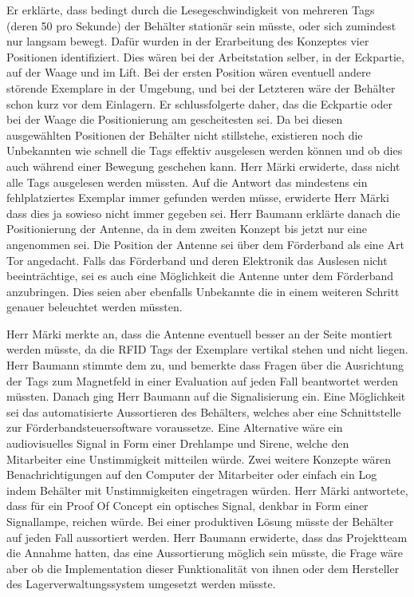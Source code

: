 \documentclass[parskip=full, a4paper]{scrreprt}
\begin{document}
Er erklärte, dass bedingt durch die Lesegeschwindigkeit von mehreren Tags (deren 50 pro Sekunde) der Behälter stationär sein müsste, oder sich zumindest nur langsam bewegt. Dafür wurden in der Erarbeitung des Konzeptes vier Positionen identifiziert. Dies wären bei der Arbeitstation selber, in der Eckpartie, auf der Waage und im Lift. Bei der ersten Position wären eventuell andere störende Exemplare in der Umgebung, und bei der Letzteren wäre der Behälter schon kurz vor dem Einlagern. Er schlussfolgerte daher, das die Eckpartie oder bei der Waage die Positionierung am gescheitesten sei. Da bei diesen ausgewählten Positionen der Behälter nicht stillstehe, existieren noch die Unbekannten wie schnell die Tags effektiv ausgelesen werden können und ob dies auch während einer Bewegung geschehen kann. Herr Märki erwiderte, dass nicht alle Tags ausgelesen werden müssten. Auf die Antwort das mindestens ein fehlplatziertes Exemplar immer gefunden werden müsse, erwiderte Herr Märki dass dies ja sowieso nicht immer gegeben sei.
Herr Baumann erklärte danach die Positionierung der Antenne, da in dem zweiten Konzept bis jetzt nur eine angenommen sei. Die Position der Antenne sei über dem Förderband als eine Art Tor angedacht. Falls das Förderband und deren Elektronik das Auslesen nicht beeinträchtige, sei es auch eine Möglichkeit die Antenne unter dem Förderband anzubringen. Dies seien aber ebenfalls Unbekannte die in einem weiteren Schritt genauer beleuchtet werden müssten.

Herr Märki merkte an, dass die Antenne eventuell besser an der Seite montiert werden müsste, da die RFID Tags der Exemplare vertikal stehen und nicht liegen. Herr Baumann stimmte dem zu, und bemerkte dass Fragen über die Ausrichtung der Tags zum Magnetfeld in einer Evaluation auf jeden Fall beantwortet werden müssten.
Danach ging Herr Baumann auf die Signalisierung ein. Eine Möglichkeit sei das automatisierte Aussortieren des Behälters, welches aber eine Schnittstelle zur Förderbandsteuersoftware voraussetze. Eine Alternative wäre ein audiovisuelles Signal in Form einer Drehlampe und Sirene, welche den Mitarbeiter eine Unstimmigkeit mitteilen würde. Zwei weitere Konzepte wären Benachrichtigungen auf den Computer der Mitarbeiter oder einfach ein Log indem Behälter mit Unstimmigkeiten eingetragen würden.
Herr Märki antwortete, dass für ein Proof Of Concept ein optisches Signal, denkbar in Form einer Signallampe, reichen würde. Bei einer produktiven Lösung müsste der Behälter auf jeden Fall aussortiert werden. Herr Baumann erwiderte, dass das Projektteam die Annahme hatten, das eine Aussortierung möglich sein müsste, die Frage wäre aber ob die Implementation dieser Funktionalität von ihnen oder dem Hersteller des Lagerverwaltungssystem umgesetzt werden müsste.
\end{document}
